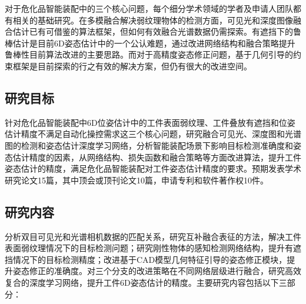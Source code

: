 \documentclass[12pt]{article}
\begin{document}
对于危化品智能装配中的三个核心问题，每个细分学术领域的学者及申请人团队都有相关的基础研究。在多模融合解决弱纹理物体的检测方面，可见光和深度图像融合估计已有可借鉴的算法框架，但如何有效融合光谱数据仍需探索。有遮挡下的鲁棒估计是目前6D姿态估计中的一个公认难题，通过改进网络结构和融合策略提升鲁棒性目前算法改进的主要思路。而对于高精度姿态修正问题，基于几何引导的约束框架是目前探索的行之有效的解决方案，但仍有很大的改进空间。

{


}



\subsection{研究目标}

针对危化品智能装配中6D位姿估计中的工件表面弱纹理、工件叠放有遮挡和位姿估计精度不满足自动化操控需求这三个核心问题，研究融合可见光、深度图和光谱图的检测和姿态估计深度学习网络，分析智能装配场景下影响目标检测准确度和姿态估计精度的因素，从网络结构、损失函数和融合策略等方面改进算法，提升工件姿态估计的精度，满足危化品智能装配对工件姿态估计精度的要求。预期发表学术研究论文15篇，其中顶会或顶刊论文10篇，申请专利和软件著作权10件。

\subsection{研究内容}

分析双目可见光和光谱相机数据的匹配关系，研究互补融合表征的方法，解决工件表面弱纹理情况下的目标检测问题；研究刚性物体的感知检测网络结构，提升有遮挡情况下的目标检测精度；改进基于CAD模型几何特征引导的姿态修正模块，提升姿态修正的准确度。对三个分支的改进策略在不同网络层级进行融合，研究高效复合的深度学习网络，提升工件6D姿态估计的精度。主要研究内容包括以下三部分：
\end{document}
